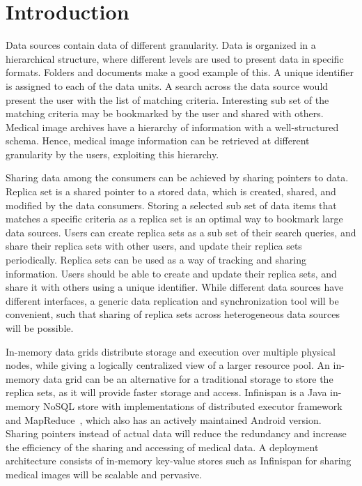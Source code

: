 \documentclass[conference]{IEEEtran}
\begin{document}
\IEEEpeerreviewmaketitle

\section{Introduction}
Data sources contain data of different granularity. Data is organized in a hierarchical structure, where different levels are used to present data in specific formats. Folders and documents make a good example of this. A unique identifier is assigned to each of the data units. A search across the data source would present the user with the list of matching criteria. Interesting sub set of the matching criteria may be bookmarked by the user and shared with others. Medical image archives have a hierarchy of information with a well-structured schema. Hence, medical image information can be retrieved at different granularity by the users, exploiting this hierarchy.

Sharing data among the consumers can be achieved by sharing pointers to data. Replica set is a shared pointer to a stored data, which is created, shared, and modified by the data consumers. Storing a selected sub set of data items that matches a specific criteria as a replica set is an optimal way to bookmark large data sources. Users can create replica sets as a sub set of their search queries, and share their replica sets with other users, and update their replica sets periodically. Replica sets can be used as a way of tracking and sharing information. Users should be able to create and update their replica sets, and share it with others using a unique identifier. While different data sources have different interfaces, a generic data replication and synchronization tool will be convenient, such that sharing of replica sets across heterogeneous data sources will be possible. 

In-memory data grids distribute storage and execution over multiple physical nodes, while giving a logically centralized view of a larger resource pool. An in-memory data grid can be an alternative for a traditional storage to store the replica sets, as it will provide faster storage and access. Infinispan is a Java in-memory NoSQL store with implementations of distributed executor framework and MapReduce~\cite{infinispan}, which also has an actively maintained Android version. Sharing pointers instead of actual data will reduce the redundancy and increase the efficiency of the sharing and accessing of medical data. A deployment architecture consists of in-memory key-value stores such as Infinispan for sharing medical images will be scalable and pervasive.
\end{document}
